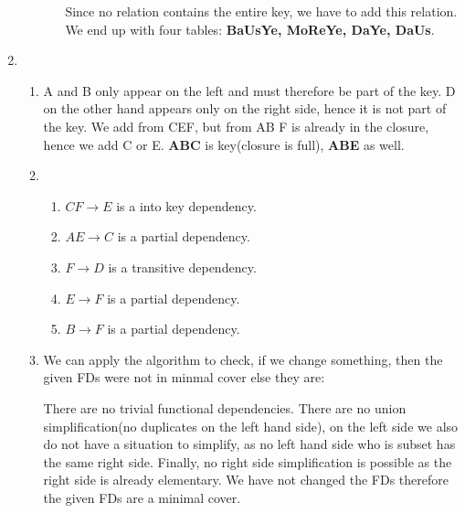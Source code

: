 \documentclass[12pt]{extarticle}
\begin{document}
\begin{flushleft}
\begin{enumerate}
\begin{enumerate}
\begin{enumerate}
 Since no relation contains the entire key, we have to add this relation. We end up with four tables: \textbf{BaUsYe, MoReYe, DaYe, DaUs}.
\end{enumerate}
\end{enumerate}



\item \begin{enumerate} 
\item A and B only appear on the left and must therefore be part of the key. D on the other hand appears only on the right side, hence it is not part of the key. We add from CEF, but from AB F is already in the closure, hence we add C or E. \textbf{ABC} is key(closure is full), \textbf{ABE} as well. 
\item \begin{enumerate}
\item $CF\rightarrow E$ is a into key dependency. 
\item $AE\rightarrow C$ is a partial dependency.
\item $F \rightarrow D$ is a transitive dependency.
\item $E\rightarrow F $ is  a partial dependency.
\item $B \rightarrow F$ is a partial dependency.
\end{enumerate}
\item We can apply the algorithm to check, if we change something, then the given FDs were not in minmal cover else they are: 

There are no trivial functional dependencies. There are no union simplification(no duplicates on the left hand side), on the left side we also do not have a situation to simplify, as no left hand side who is subset has the same right side. Finally, no right side simplification is possible as the right side is already elementary.
We have not changed the FDs therefore the given FDs are a minimal cover.

\end{enumerate}






\end{enumerate}
\end{flushleft}
\end{document}
